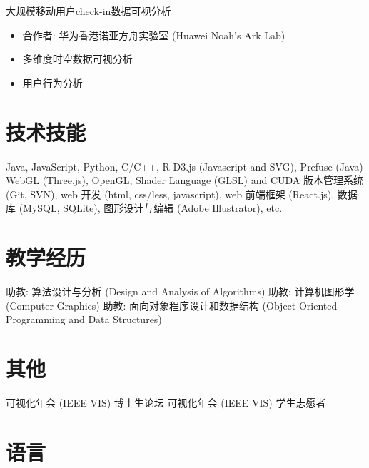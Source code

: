 \documentclass[10pt,a4paper,roman]{moderncv} %
\begin{document}
 {大规模移动用户check-in数据可视分析
	\begin{itemize}
	\item 合作者: 华为香港诺亚方舟实验室 (Huawei Noah's Ark Lab)
	\item 多维度时空数据可视分析
	\item 用户行为分析
	\end{itemize}
}


\section{技术技能}

 {Java, JavaScript, Python, C/C++, R}
 {D3.js (Javascript and SVG), Prefuse (Java)}
 {WebGL (Three.js), OpenGL, Shader Language (GLSL) and CUDA}
 {版本管理系统 (Git, SVN), web 开发 (html, css/less, javascript), web 前端框架 (React.js), 数据库 (MySQL, SQLite), 图形设计与编辑 (Adobe Illustrator), etc.}



\section{教学经历}

 {助教: 算法设计与分析 (Design and Analysis of Algorithms)}
 {助教: 计算机图形学 (Computer Graphics)}
 {助教: 面向对象程序设计和数据结构 (Object-Oriented Programming and Data Structures)}




\section{其他}


 {可视化年会 (IEEE VIS) 博士生论坛}
 {可视化年会 (IEEE VIS) 学生志愿者}


\section{语言}


\clearpage
\end{document}
